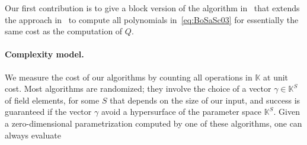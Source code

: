 \documentclass[12pt]{article}
\def\K{\mathbb{K}}
\def\K {\ensuremath{\mathbb{K}}}
\begin{document}
Our first contribution is to give a block version of
the algorithm in~\cite{BoSaSc03} that extends the approach
in~\cite{Steel15} to compute all polynomials in~\eqref{eq:BoSaSc03}
for essentially the same cost as the computation of $Q$.


\paragraph{Complexity model.}
We measure the cost of our algorithms by counting all operations in
$\K$ at unit cost. Most algorithms are randomized; they involve the
choice of a vector $\gamma \in \K^S$ of field elements, for some $S$
that depends on the size of our input, and success is guaranteed if
the vector $\gamma$ avoid a hypersurface of the parameter space
$\K^S$. Given a zero-dimensional parametrization computed by one of
these algorithms, one can always evaluate 





\end{document}
